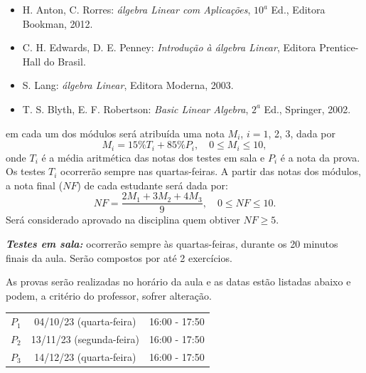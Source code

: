\documentclass[12pt]{exam}
\begin{document}
\vspace{0.5cm}
\begin{itemize}


    \item H. Anton, C. Rorres: {\it álgebra Linear com Aplicações}, $10^a$ Ed., Editora Bookman, 2012.

    \item C. H. Edwards, D. E. Penney: {\it Introdução à álgebra Linear}, Editora Prentice-Hall do Brasil.

    \item S. Lang: {\it álgebra Linear}, Editora Moderna, 2003.

    \item T. S. Blyth, E. F. Robertson: {\it Basic Linear Algebra}, $2^a$ Ed., Springer, 2002.
\end{itemize}

 em cada um dos módulos será atribuída uma nota $M_i$, $i=1$, 2, 3, dada por
\[
    M_i = 15\%T_i + 85\%P_i, \quad 0 \le M_i \le 10,
\]
onde $T_i$ é a média aritmética das notas dos testes em sala e $P_i$ é a nota da prova. Os testes $T_i$ ocorrerão sempre nas quartas-feiras.
A partir das notas dos módulos, a nota final ($NF$) de cada estudante será dada por:
\[
    NF = \dfrac{2M_1 + 3M_2 + 4M_3}{9}, \quad 0 \le NF \le 10.
\]
Será considerado aprovado na disciplina quem obtiver $NF \ge 5$.

\vspace{0.5cm}

\noindent \textbf{\textit{Testes em sala:}} ocorrerão sempre às quartas-feiras, durante os 20 minutos finais da aula. Serão compostos por até 2 exercícios.


As provas serão realizadas no horário da aula e as datas estão listadas abaixo e podem, a critério do professor, sofrer alteração.

\begin{center}
    \begin{tabular}{c|c|c}
        \hline\hline
        \hspace{1cm}{\bf Prova}\hspace{1cm} & \hspace{3cm}{\bf Data}\hspace{3cm} & \hspace{1.7cm}{\bf Horário}\hspace{1.7cm} \\
        \hline\hline
        $P_1$ & 04/10/23 (quarta-feira) \phantom{x} & 16:00 - 17:50 \\
        \hline
        $P_2$ & 13/11/23 (segunda-feira) \phantom{x} & 16:00 - 17:50 \\
        \hline
        $P_3$ & 14/12/23 (quarta-feira) \phantom{x} & 16:00 - 17:50 \\
        \hline\hline
    \end{tabular}
\end{center}
\end{document}
